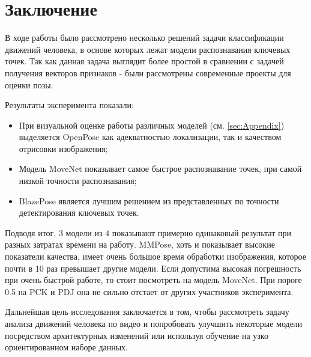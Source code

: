 \section{Заключение}
\label{sec:Chapter5} 

В ходе работы было рассмотрено несколько решений задачи классификации движений человека, в основе которых лежат модели распознавания  ключевых точек. Так как данная задача выглядит более простой в сравнении с задачей получения векторов признаков - были рассмотрены современные проекты для оценки позы.

Результаты эксперимента показали:
\begin{itemize}
	\item При визуальной оценке работы различных моделей (см. \autoref{sec:Appendix}) выделяется OpenPose как адекватностью локализации, так и качеством отрисовки изображения;
	\item Модель MoveNet показывает самое быстрое распознавание точек, при самой низкой точности распознавания;
	\item BlazePose является лучшим решением из представленных по точности детектирования ключевых точек.
\end{itemize} 

Подводя итог, 3 модели из 4 показывают примерно одинаковый результат при разных затратах времени на работу. MMPose, хоть и показывает высокие показатели качества, имеет очень большое время обработки изображения, которое почти в 10 раз превышает другие модели. Если допустима высокая погрешность при очень быстрой работе, то стоит посмотреть на модель MoveNet. При пороге 0.5 на PCK и PDJ она не сильно отстает от других участников эксперимента.

Дальнейшая цель исследования заключается в том, чтобы рассмотреть задачу анализа движений человека по видео и попробовать улучшить некоторые модели посредством архитектурных изменений или используя обучение на узко ориентированном наборе данных.





\newpage